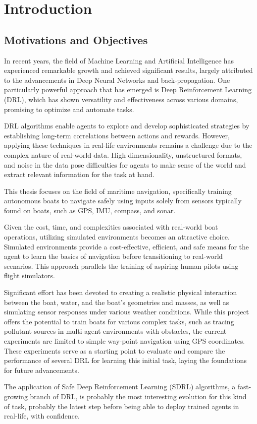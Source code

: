 \section{Introduction}


\subsection{Motivations and Objectives}

\begin{textblock}
In recent years, the field of Machine Learning and Artificial Intelligence has experienced remarkable growth and achieved significant results, largely attributed to the advancements in Deep Neural Networks and back-propagation. One particularly powerful approach that has emerged is Deep Reinforcement Learning (DRL), which has shown versatility and effectiveness across various domains, promising to optimize and automate tasks.

DRL algorithms enable agents to explore and develop sophisticated strategies by establishing long-term correlations between actions and rewards. However, applying these techniques in real-life environments remains a challenge due to the complex nature of real-world data. High dimensionality, unstructured formats, and noise in the data pose difficulties for agents to make sense of the world and extract relevant information for the task at hand.

This thesis focuses on the field of maritime navigation, specifically training autonomous boats to navigate safely using inputs solely from sensors typically found on boats, such as GPS, IMU, compass, and sonar.

Given the cost, time, and complexities associated with real-world boat operations, utilizing simulated environments becomes an attractive choice. Simulated environments provide a cost-effective, efficient, and safe means for the agent to learn the basics of navigation before transitioning to real-world scenarios. This approach parallels the training of aspiring human pilots using flight simulators.

Significant effort has been devoted to creating a realistic physical interaction between the boat, water, and the boat's geometries and masses, as well as simulating sensor responses under various weather conditions. While this project offers the potential to train boats for various complex tasks, such as tracing pollutant sources in multi-agent environments with obstacles, the current experiments are limited to simple way-point navigation using GPS coordinates. These experiments serve as a starting point to evaluate and compare the performance of several DRL for learning this initial task, laying the foundations for future advancements.

The application of Safe Deep Reinforcement Learning (SDRL) algorithms, a fast-growing branch of DRL, is probably the most interesting evolution for this kind of task, probably the latest step before being able to deploy trained agents in real-life, with confidence.
\end{textblock}


